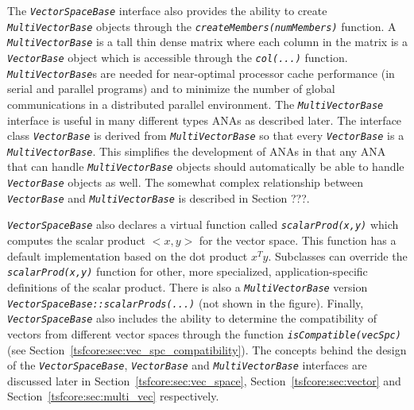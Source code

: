 \documentclass[pdf,ps2pdf,11pt]{SANDreport}
\begin{document}
The {}\texttt{\textit{Vector\-Space\-Base}} interface also provides the
ability to create {}\texttt{\textit{Multi\-Vector\-Base}} objects through
the {}\texttt{\textit{createMembers(numMembers)}} function.  A
{}\texttt{\textit{Multi\-Vector\-Base}} is a tall thin dense matrix where
each column in the matrix is a {}\texttt{\textit{Vector\-Base}} object which
is accessible through the {}\texttt{\textit{col(...)}} function.
{}\texttt{\textit{Multi\-Vector\-Base}}s are needed for near-optimal
processor cache performance (in serial and parallel programs) and to
minimize the number of global communications in a distributed parallel
environment.  The {}\texttt{\textit{Multi\-Vector\-Base}} interface is
useful in many different types ANAs as described later.  The interface
class {}\texttt{\textit{Vector\-Base}} is derived from
{}\texttt{\textit{Multi\-Vector\-Base}} so that every
{}\texttt{\textit{Vector\-Base}} is a {}\texttt{\textit{Multi\-Vector\-Base}}.
This simplifies the development of ANAs in that any ANA that can
handle {}\texttt{\textit{Multi\-Vector\-Base}} objects should automatically
be able to handle {}\texttt{\textit{Vector\-Base}} objects as well.  The
somewhat complex relationship between {}\texttt{\textit{Vector\-Base}} and
{}\texttt{\textit{Multi\-Vector\-Base}} is described in Section ???.

{}\texttt{\textit{Vector\-Space\-Base}} also declares a virtual function
called {}\texttt{\textit{scalarProd(x,y)}} which computes the scalar product
$<x,y>$ for the vector space. This function has a default implementation based
on the dot product $x^T y$.  Subclasses can override the
{}\texttt{\textit{scalarProd(x,y)}} function for other, more specialized,
application-specific definitions of the scalar product. There is also a
{}\texttt{\textit{Multi\-Vector\-Base}} version
{}\texttt{\textit{Vector\-Space\-Base\-::scalarProds(...)}} (not shown in the
figure).  Finally, {}\texttt{\textit{Vector\-Space\-Base}} also includes the
ability to determine the compatibility of vectors from different vector spaces
through the function {}\texttt{\textit{isCompatible(vecSpc)}} (see
Section~\ref{tsfcore:sec:vec_spc_compatibility}).  The concepts behind the
design of the {}\texttt{\textit{Vector\-Space\-Base}},
{}\texttt{\textit{Vector\-Base}} and {}\texttt{\textit{Multi\-Vector\-Base}}
interfaces are discussed later in Section~\ref{tsfcore:sec:vec_space},
Section~\ref{tsfcore:sec:vector} and Section~\ref{tsfcore:sec:multi_vec}
respectively.
\end{document}
